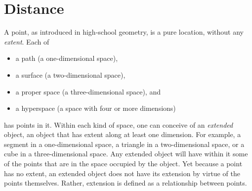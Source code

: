 

\chapter{Distance}
\label{ch:distance}

A point, as introduced in high-school geometry, is a pure location, without any
\emph{extent}.  Each of
\begin{itemize}[noitemsep]
   \item a path (a one-dimensional space),
   \item a surface (a two-dimensional space),
   \item a proper space (a three-dimensional space), and
   \item a hyperspace (a space with four or more dimensions)
\end{itemize}
has points in it.  Within each kind of space, one can conceive of an
\emph{extended} object, an object that has extent along at least one dimension.
For example, a segment in a one-dimensional space, a triangle in a
two-dimensional space, or a cube in a three-dimensional space.  Any extended
object will have within it some of the points that are in the space occupied by
the object.  Yet because a point has no extent, an extended object does not
have its extension by virtue of the points themselves.  Rather, extension is
defined as a relationship between points.

